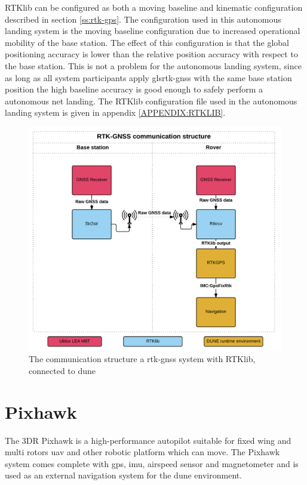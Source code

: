 RTKlib can be configured as both a moving baseline and kinematic configuration described in section \ref{ss:rtk-gps}. The configuration used in this autonomous landing system is the moving baseline configuration due to increased operational mobility of the base station. The effect of this configuration is that the global positioning accuracy is lower than the relative position accuracy with respect to the base station. This is not a problem for the autonomous landing system, since as long as all system participants apply gls{rtk-gnss} with the same base station position the high baseline accuracy is good enough to safely perform a autonomous net landing. The RTKlib configuration file used in the autonomous landing system is given in appendix \ref{APPENDIX:RTKLIB}.
\begin{figure}[h]
	\centering
		\includegraphics[scale=0.7]{figs/RTKGNSS.png}
		\caption{The communication structure a \gls{rtk-gnss} system with RTKlib, connected to \gls{dune}}
		\label{figure:RTKLIB_STRUCTURE}
\end{figure}
\newpage

\section{Pixhawk}\label{ss:Pixhawk}
The 3DR Pixhawk is a high-performance autopilot suitable for fixed wing and multi rotors \gls{uav} and other robotic platform which can move. The Pixhawk system comes complete with \gls{gps}, \gls{imu}, airspeed sensor and magnetometer and is used as an external navigation system for the \gls{dune} environment.
